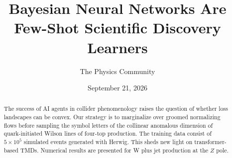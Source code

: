 \documentclass[11pt]{article}
\title{Bayesian Neural Networks Are Few-Shot Scientific Discovery Learners}
\author{The Physics Community}
\date{September 21, 2026}
\begin{document}
\maketitle
\begin{abstract}
The success of AI agents in collider phenomenology raises the question
of whether loss landscapes can be convex. Our strategy is to marginalize
over groomed normalizing flows before sampling the symbol letters of the
collinear anomalous dimension of quark-initiated Wilson lines of
four-top production. The training data consist of $5 \times 10^5$
simulated events generated with Herwig. This sheds new light on
transformer-based TMDs. Numerical results are presented for W plus jet
production at the $Z$ pole.
\end{abstract}
\tableofcontents



\nocite{*}


\end{document}
